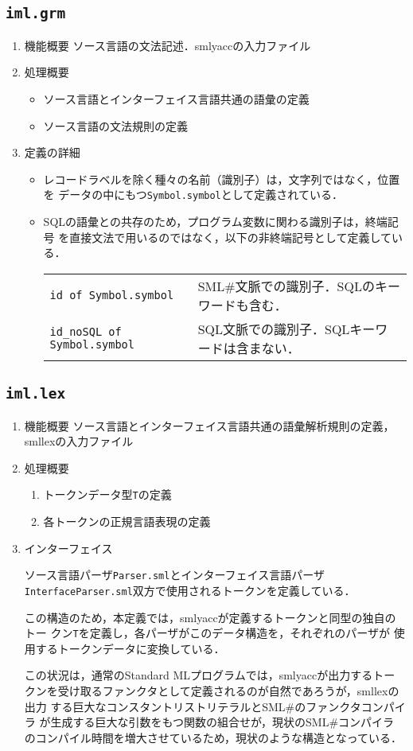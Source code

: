 \documentclass{jbook}
\newcommand{\smlsharp}{SML\#}
\newcommand{\code}[1]{\mbox{\large\tt #1}}
\begin{document}
\subsection{\code{iml.grm}}
\begin{enumerate}
\item 機能概要 ソース言語の文法記述．smlyaccの入力ファイル
\item 処理概要 
\begin{itemize}
\item ソース言語とインターフェイス言語共通の語彙の定義
\item ソース言語の文法規則の定義
\end{itemize}
\item 定義の詳細
\begin{itemize}
\item レコードラベルを除く種々の名前（識別子）は，文字列ではなく，位置を
データの中にもつ\code{Symbol.symbol}として定義されている．
\item SQLの語彙との共存のため，プログラム変数に関わる識別子は，終端記号
を直接文法で用いるのではなく，以下の非終端記号として定義している．
\begin{tabular}{ll}
\code{id of Symbol.symbol} 
& 
\smlsharp{}文脈での識別子．SQLのキーワードも含む．\\
\code{id\_noSQL of Symbol.symbol}
& 
SQL文脈での識別子．SQLキーワードは含まない．
\end{tabular}

\end{itemize}
\end{enumerate}

\subsection{\code{iml.lex}}
\begin{enumerate}
\item 機能概要 ソース言語とインターフェイス言語共通の語彙解析規則の定義，smllexの入力ファイル
\item 処理概要 
\begin{enumerate}
\item トークンデータ型\code{T}の定義
\item 各トークンの正規言語表現の定義
\end{enumerate}
\item インターフェイス

ソース言語パーザ\code{Parser.sml}とインターフェイス言語パーザ
\code{InterfaceParser.sml}双方で使用されるトークンを定義している．

この構造のため，本定義では，smlyaccが定義するトークンと同型の独自のトー
クン\code{T}を定義し，各パーザがこのデータ構造を，それぞれのパーザが
使用するトークンデータに変換している．

	この状況は，通常のStandard MLプログラムでは，smlyaccが出力するトー
クンを受け取るファンクタとして定義されるのが自然であろうが，smllexの出力
する巨大なコンスタントリストリテラルと\smlsharp{}のファンクタコンパイラ
が生成する巨大な引数をもつ関数の組合せが，現状の\smlsharp{}コンパイラ
のコンパイル時間を増大させているため，現状のような構造となっている．
\end{enumerate}
\end{document}
